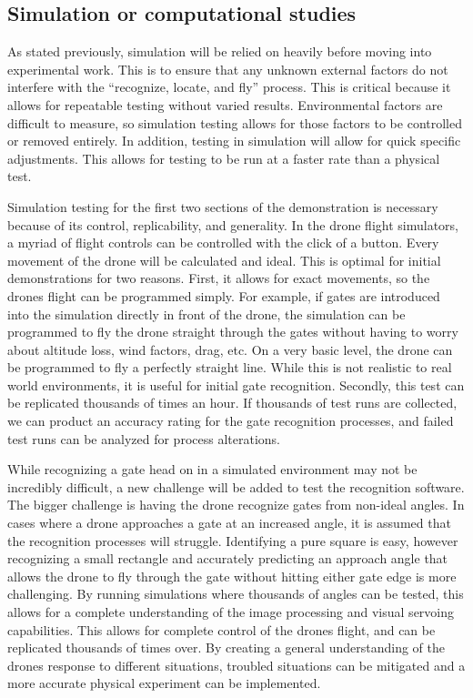 \documentclass[onecolumn,10pt]{IEEEtran}
\begin{document}
\subsection{Simulation or computational studies}
As stated previously, simulation will be relied on heavily before moving into experimental work. This is to ensure that any unknown external factors do not interfere with the ``recognize, locate, and fly'' process. This is critical because it allows for repeatable testing without varied results. Environmental factors are difficult to measure, so simulation testing allows for those factors to be controlled or removed entirely. In addition, testing in simulation will allow for quick specific adjustments. This allows for testing to be run at a faster rate than a physical test.

Simulation testing for the first two sections of the demonstration is necessary because of its control, replicability, and generality. In the drone flight simulators, a myriad of flight controls can be controlled with the click of a button. Every movement of the drone will be calculated and ideal. This is optimal for initial demonstrations for two reasons. First, it allows for exact movements, so the drones flight can be programmed simply. For example, if gates are introduced into the simulation directly in front of the drone, the simulation can be programmed to fly the drone straight through the gates without having to worry about altitude loss, wind factors, drag, etc. On a very basic level, the drone can be programmed to fly a perfectly straight line. While this is not realistic to real world environments, it is useful for initial gate recognition. Secondly, this test can be replicated thousands of times an hour. If thousands of test runs are collected, we can product an accuracy rating for the gate recognition processes, and failed test runs can be analyzed for process alterations.

While recognizing a gate head on in a simulated environment may not be incredibly difficult, a new challenge will be added to test the recognition software. The bigger challenge is having the drone recognize gates from non-ideal angles. In cases where a drone approaches a gate at an increased angle, it is assumed that the recognition processes will struggle. Identifying a pure square is easy, however recognizing a small rectangle and accurately predicting an approach angle that allows the drone to fly through the gate without hitting either gate edge is more challenging. By running simulations where thousands of angles can be tested, this allows for a complete understanding of the image processing and visual servoing capabilities. This allows for complete control of the drones flight, and can be replicated thousands of times over. By creating a general understanding of the drones response to different situations, troubled situations can be mitigated and a more accurate physical experiment can be implemented.
\end{document}
